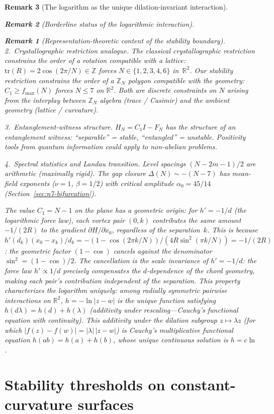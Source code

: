 \documentclass[12pt, a4paper]{article}
\newtheorem{remark}{Remark}[section]
\numberwithin{equation}{section}
\begin{document}
\begin{remark}[The logarithm as the unique dilation-invariant interaction]
\begin{remark}[Borderline status of the logarithmic interaction]
\begin{remark}[Representation-theoretic content of the stability boundary]
\emph{2.\ Crystallographic restriction analogue.}
The classical crystallographic restriction constrains the order
of a rotation compatible with a lattice: $\mathrm{tr}(R) = 2\cos(2\pi/N)
\in \mathbb{Z}$ forces $N \in \{1,2,3,4,6\}$ in~$\mathbb{R}^2$.
Our stability restriction constrains the order of a $\mathbb{Z}_N$
polygon compatible with the geometry: $C_1 \ge f_{\max}(N)$ forces
$N \le 7$ on $\mathbb{R}^2$.  Both are discrete constraints on
$N$ arising from the interplay between $\mathbb{Z}_N$ algebra
(trace / Casimir) and the ambient geometry (lattice / curvature).

\emph{3.\ Entanglement-witness structure.}
$H_N = C_1 I - F_N$ has the structure of an entanglement witness:
``separable'' = stable, ``entangled'' = unstable.  Positivity tools
from quantum information could apply to non-abelian problems.

\emph{4.\ Spectral statistics and Landau transition.}
Level spacings $(N{-}2m{-}1)/2$ are arithmetic (maximally rigid).
The gap closure $\Delta(N) \sim -(N{-}7)$ has mean-field exponents
($\nu = 1$, $\beta = 1/2$) with critical amplitude $\alpha_0 = 45/14$
(Section~\ref{sec:n7-bifurcation}).
\end{remark}

The value $C_1 = N{-}1$ on the plane has a geometric origin: for
$h' = -1/d$ (the logarithmic force law), each vortex pair $(0,k)$
contributes the \emph{same} amount $-1/(2R)$ to the gradient
$\partial H/\partial x_0$, regardless of the separation~$k$.  This
is because $h'(d_k)(x_0{-}x_k)/d_k = -(1{-}\cos(2\pi k/N))/
(4R\sin^2(\pi k/N)) = -1/(2R)$: the geometric factor
$(1{-}\cos)$ cancels against the denominator $\sin^2 = (1{-}\cos)/2$.
The cancellation is the \emph{scale invariance} of $h' = -1/d$:
the force law $h' \propto 1/d$ precisely compensates the
$d$-dependence of the chord geometry, making each pair's contribution
independent of the separation.  This property characterizes the
logarithm \emph{uniquely}: among radially symmetric pairwise
interactions on $\mathbb{R}^2$, $h = -\ln|z{-}w|$ is the unique
function satisfying $h(d\lambda) = h(d) + h(\lambda)$ (additivity
under rescaling---Cauchy's functional equation with continuity).
This additivity under the dilation subgroup $z \mapsto \lambda z$
(for which $|f(z){-}f(w)| = |\lambda|\,|z{-}w|$) is Cauchy's
multiplicative functional equation $h(ab) = h(a) + h(b)$,
whose unique continuous solution is $h = c\ln$.


\section{Stability thresholds on constant-curvature surfaces}
\label{sec:curvature-thresholds}
\label{sec:curvature-invariant}


\end{remark}
\end{remark}
\end{document}
